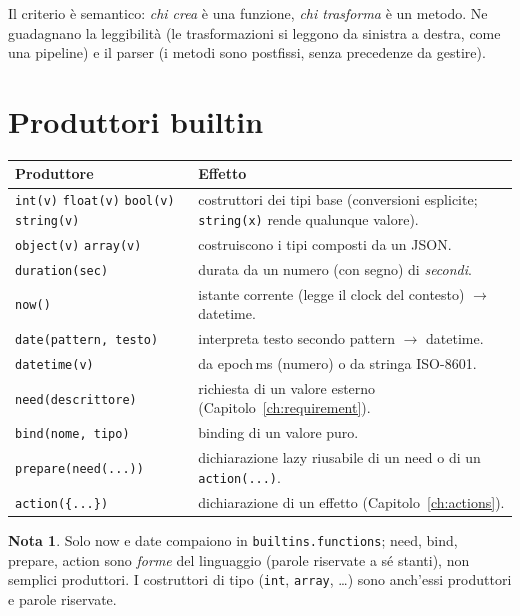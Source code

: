 \documentclass[11pt,a4paper]{book}
\let\code\lstinline
\newcommand{\ic}[1]{{\ttfamily #1}}
\theoremstyle{definition}
\newtheorem*{nota}{Nota}
\begin{document}
{{{{Il criterio è semantico: \emph{chi crea} è una funzione, \emph{chi trasforma} è un
metodo. Ne guadagnano la leggibilità (le trasformazioni si leggono da sinistra a
destra, come una pipeline) e il parser (i metodi sono postfissi, senza precedenze
da gestire).

\section{Produttori builtin}

\begin{center}
\small
\begin{tabular}{@{}l p{9.2cm}@{}}
\toprule
\textbf{Produttore} & \textbf{Effetto} \\
\midrule
\code|int(v)| \code|float(v)| \code|bool(v)| \code|string(v)| & costruttori dei
tipi base (conversioni esplicite; \code|string(x)| rende qualunque valore). \\
\code|object(v)| \code|array(v)| & costruiscono i tipi composti da un JSON. \\
\code|duration(sec)| & durata da un numero (con segno) di \emph{secondi}. \\
\code|now()| & istante corrente (legge il \ic{clock} del contesto) $\rightarrow$ \ic{datetime}. \\
\code|date(pattern, testo)| & interpreta \ic{testo} secondo \ic{pattern} $\rightarrow$ \ic{datetime}. \\
\code|datetime(v)| & da epoch\,ms (numero) o da stringa ISO-8601. \\
\code|need(descrittore)| & richiesta di un valore esterno (Capitolo~\ref{ch:requirement}). \\
\code|bind(nome, tipo)| & binding di un valore puro. \\
\code|prepare(need(...))| & dichiarazione lazy riusabile di un need o di un
\code|action(...)|. \\
\code|action({...})| & dichiarazione di un effetto (Capitolo~\ref{ch:actions}). \\
\bottomrule
\end{tabular}
\end{center}

\begin{nota}
Solo \ic{now} e \ic{date} compaiono in \code|builtins.functions|; \ic{need},
\ic{bind}, \ic{prepare}, \ic{action} sono \emph{forme} del linguaggio (parole
riservate a sé stanti), non semplici produttori. I costruttori di tipo
(\code|int|, \code|array|, \ldots) sono anch'essi produttori e parole riservate.
\end{nota}

}}}}
\end{document}
